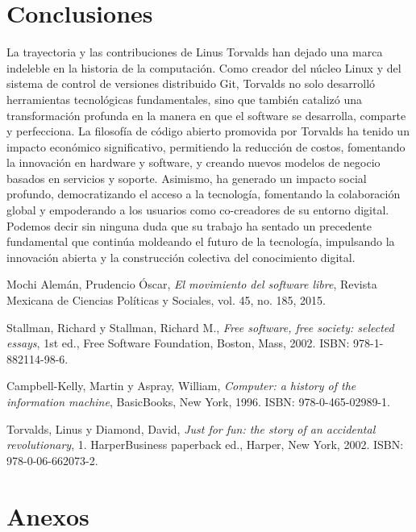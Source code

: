 \documentclass[a4paper,12pt]{article}
\begin{document}
\section{Conclusiones}
La trayectoria y las contribuciones de Linus Torvalds han dejado una marca
indeleble en la historia de la computación. Como creador del núcleo Linux y del
sistema de control de versiones distribuido Git, Torvalds no solo desarrolló
herramientas tecnológicas fundamentales, sino que también catalizó una
transformación profunda en la manera en que el software se desarrolla, comparte
y perfecciona.
La filosofía de código abierto promovida por Torvalds ha tenido un impacto
económico significativo, permitiendo la reducción de costos, fomentando la
innovación en hardware y software, y creando nuevos modelos de negocio basados
en servicios y soporte. Asimismo, ha generado un impacto social profundo,
democratizando el acceso a la tecnología, fomentando la colaboración global y
empoderando a los usuarios como co-creadores de su entorno digital.
Podemos decir sin ninguna duda que su trabajo ha sentado un precedente
fundamental que continúa moldeando el futuro de la tecnología, impulsando la
innovación abierta y la construcción colectiva del conocimiento digital.


\newpage

\begin{thebibliography}{9}

Mochi Alemán, Prudencio Óscar, \textit{El movimiento del software libre}, Revista Mexicana de Ciencias Políticas y Sociales, vol. 45, no. 185, 2015.

Stallman, Richard y Stallman, Richard M., \textit{Free software, free society: selected essays}, 1st ed., Free Software Foundation, Boston, Mass, 2002. ISBN: 978-1-882114-98-6.

Campbell-Kelly, Martin y Aspray, William, \textit{Computer: a history of the information machine}, BasicBooks, New York, 1996. ISBN: 978-0-465-02989-1.

Torvalds, Linus y Diamond, David, \textit{Just for fun: the story of an accidental revolutionary}, 1. HarperBusiness paperback ed., Harper, New York, 2002. ISBN: 978-0-06-662073-2.

\end{thebibliography}
\newpage


\section*{Anexos} 
\label{anexos} 
\end{document}
